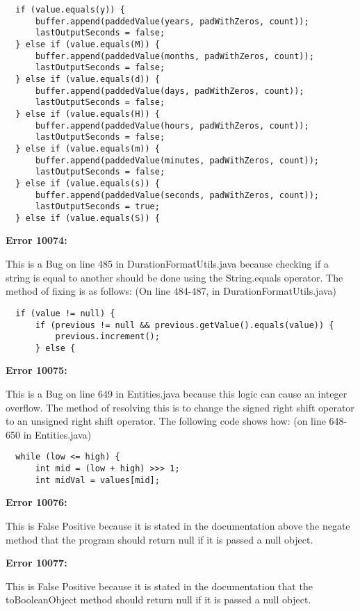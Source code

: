 \documentclass{article}
\begin{document}
\begin{enumerate}[(a)]
  \begin{lstlisting}
  if (value.equals(y)) {
      buffer.append(paddedValue(years, padWithZeros, count));
      lastOutputSeconds = false;
  } else if (value.equals(M)) {
      buffer.append(paddedValue(months, padWithZeros, count));
      lastOutputSeconds = false;
  } else if (value.equals(d)) {
      buffer.append(paddedValue(days, padWithZeros, count));
      lastOutputSeconds = false;
  } else if (value.equals(H)) {
      buffer.append(paddedValue(hours, padWithZeros, count));
      lastOutputSeconds = false;
  } else if (value.equals(m)) {
      buffer.append(paddedValue(minutes, padWithZeros, count));
      lastOutputSeconds = false;
  } else if (value.equals(s)) {
      buffer.append(paddedValue(seconds, padWithZeros, count));
      lastOutputSeconds = true;
  } else if (value.equals(S)) {
  \end{lstlisting}

  \textbf{Error 10074:}

  This is a Bug on line 485 in DurationFormatUtils.java because checking if a string is equal to another should be done using the String.equals operator. The method of fixing is as follows: (On line 484-487, in DurationFormatUtils.java)

  \begin{lstlisting}
  if (value != null) {
      if (previous != null && previous.getValue().equals(value)) {
          previous.increment();
      } else {
  \end{lstlisting}

  \textbf{Error 10075:}

  This is a Bug on line 649 in Entities.java because this logic can cause an integer overflow. The method of resolving this is to change the signed right shift operator to an unsigned right shift operator. The following code shows how: (on line 648-650 in Entities.java)

  \begin{lstlisting}
  while (low <= high) {
      int mid = (low + high) >>> 1;
      int midVal = values[mid];

  \end{lstlisting}

  \textbf{Error 10076:}

  This is False Positive because it is stated in the documentation above the negate method that the program should return null if it is passed a null object.

  \textbf{Error 10077:}

  This is False Positive because it is stated in the documentation that the toBooleanObject method should return null if it is passed a null object.


\end{enumerate}
\end{document}
